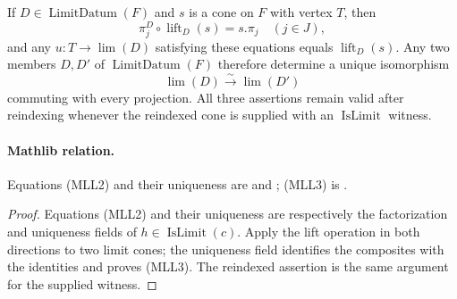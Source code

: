 \begin{lemma}
  \label{lemma:nagata-limit-datum}

  If $D\in\operatorname{LimitDatum}(F)$ and $s$ is a cone on $F$ with vertex
  $T$, then
  \[
    \pi_j^D\circ\operatorname{lift}_D(s)=s.\pi_j
      \quad(j\in J),                                             \tag{MLL2}
  \]
  and any $u\colon T\to\lim(D)$ satisfying these equations equals
  $\operatorname{lift}_D(s)$.  Any two members $D,D'$ of
  $\operatorname{LimitDatum}(F)$ therefore determine a unique isomorphism
  \[
    \lim(D)\xrightarrow{\sim}\lim(D')                           \tag{MLL3}
  \]
  commuting with every projection.  All three assertions remain valid
  after reindexing whenever the reindexed cone is supplied with an
  $\operatorname{IsLimit}$ witness.

  \paragraph{Mathlib relation.}
  Equations (MLL2) and their uniqueness are
  \texttt{} and
  \texttt{}; (MLL3) is
  \texttt{}.
\end{lemma}

\begin{proof}
  Equations (MLL2) and their uniqueness are respectively the factorization
  and uniqueness fields of $h\in\operatorname{IsLimit}(c)$.  Apply the lift
  operation in both directions to two limit cones; the uniqueness field
  identifies the composites with the identities and proves (MLL3).  The
  reindexed assertion is the same argument for the supplied witness.
\end{proof}

